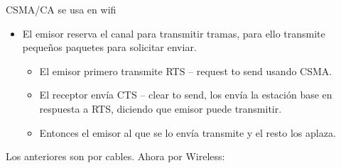 \documentclass[12pt, twoside, openright]{report} %
\begin{document}
CSMA/CA se usa en wifi

\begin{itemize}
	\item El emisor reserva el canal para transmitir tramas, para ello
	      transmite pequeños paquetes para solicitar enviar.

	      \begin{itemize}
		      \item El emisor primero transmite RTS -- request to send usando
		            CSMA.
		      \item El receptor envía CTS -- clear to send, los envía la
		            estación base en respuesta a RTS, diciendo que emisor
		            puede transmitir.
		      \item Entonces el emisor al que se lo envía transmite y el resto
		            los aplaza.
	      \end{itemize}
\end{itemize}

Los anteriores son por cables. Ahora por Wireless:
\end{document}
